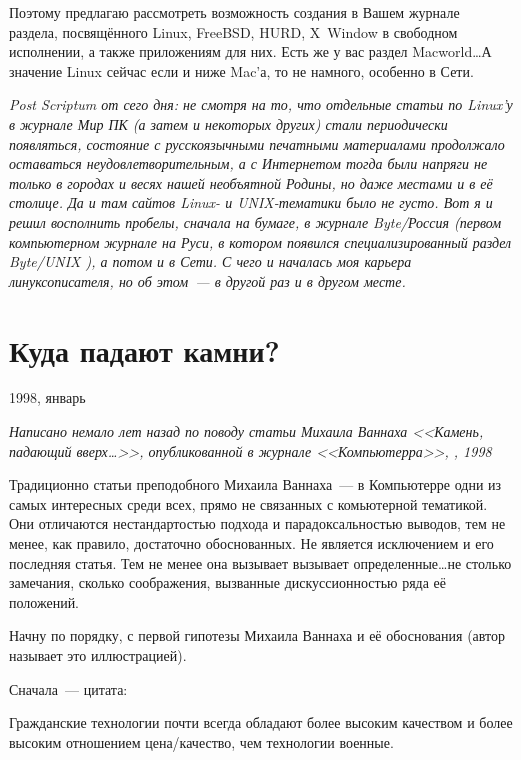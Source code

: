 Поэтому предлагаю рассмотреть возможность создания в Вашем журнале раздела, посвящённого Linux, FreeBSD, HURD, X~Window в свободном исполнении, а также приложениям для них. Есть же у вас раздел Macworld\dots А значение Linux сейчас если и ниже Mac'а, то не намного, особенно в Сети.


\textit{Post Scriptum от сего дня: не смотря на то, что отдельные статьи по Linux'у в журнале 
Мир ПК
 (а затем и некоторых других) стали периодически появляться, состояние с русскоязычными печатными материалами продолжало оставаться неудовлетворительным, а с Интернетом тогда были напряги не только в городах и весях нашей необъятной Родины, но даже местами и в её столице. Да и там сайтов Linux- и UNIX-тематики было не густо. Вот я и решил восполнить пробелы, сначала на бумаге, в журнале 
Byte/Россия
 (первом компьютерном журнале на Руси, в котором появился специализированный раздел 
Byte/UNIX
), а потом и в Сети. С чего и началась моя карьера линуксописателя, но об этом~--- в другой раз и в другом месте.}

\section{Куда падают камни?} 
\begin{timeline}1998, январь\end{timeline}

\textsl{Написано немало лет назад по поводу статьи Михаила Ваннаха <<Камень, падающий вверх\dots>>, опубликованной в журнале <<Компьютерра>>, , 1998}\medskip

Традиционно статьи преподобного Михаила Ваннаха~--- в Компьютерре одни из самых интересных среди всех, прямо не связанных с комьютерной тематикой. Они отличаются нестандартостью подхода и парадоксальностью выводов, тем не менее, как правило, достаточно обоснованных. Не является исключением и его последняя статья. Тем не менее она вызывает вызывает определенные\dots не столько замечания, сколько соображения, вызванные дискуссионностью ряда её положений.

Начну по порядку, с первой гипотезы Михаила Ваннаха и её обоснования (автор называет это иллюстрацией). 

Сначала~--- цитата:

\begin{shadequote}{}
Гражданские технологии почти всегда обладают более высоким качеством и более высоким отношением цена/качество, чем технологии военные.
\end{shadequote}


